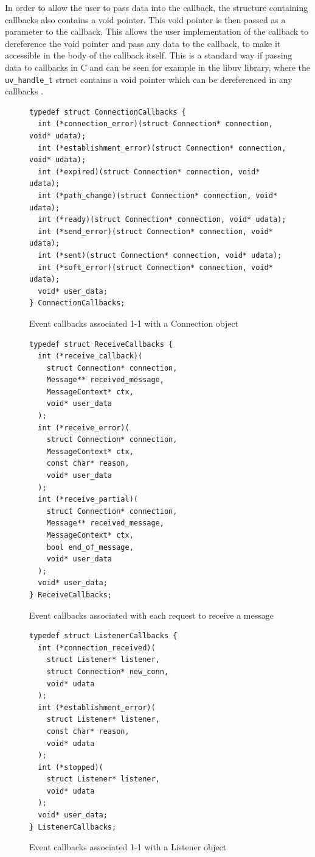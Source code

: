 In order to allow the user to pass data into the callback, the structure
containing callbacks also contains a void pointer. This void pointer
is then passed as a parameter to the callback. This allows the user
implementation of the callback to dereference the void pointer
and pass any data to the callback, to make it accessible in
the body of the callback itself. This is a standard 
way if passing data to callbacks in C and can be
seen for example in the libuv library, where the
\texttt{uv\_handle\_t} struct contains a void pointer which
can be dereferenced in any callbacks \cite{libuvUv_handle_tDocumentation2025}.

\begin{figure}[H]
\centering
\begin{verbatim}
typedef struct ConnectionCallbacks {
  int (*connection_error)(struct Connection* connection, void* udata);
  int (*establishment_error)(struct Connection* connection, void* udata);
  int (*expired)(struct Connection* connection, void* udata);
  int (*path_change)(struct Connection* connection, void* udata);
  int (*ready)(struct Connection* connection, void* udata);
  int (*send_error)(struct Connection* connection, void* udata);
  int (*sent)(struct Connection* connection, void* udata);
  int (*soft_error)(struct Connection* connection, void* udata);
  void* user_data;
} ConnectionCallbacks;
\end{verbatim}
\label{fig:connectionCallbackStructure}
\caption{Event callbacks associated 1-1 with a Connection object}
\end{figure}

\begin{figure}[H]
\centering
\begin{verbatim}
typedef struct ReceiveCallbacks {
  int (*receive_callback)(
    struct Connection* connection,
    Message** received_message,
    MessageContext* ctx,
    void* user_data
  );
  int (*receive_error)(
    struct Connection* connection,
    MessageContext* ctx,
    const char* reason,
    void* user_data
  );
  int (*receive_partial)(
    struct Connection* connection,
    Message** received_message,
    MessageContext* ctx,
    bool end_of_message, 
    void* user_data
  );
  void* user_data;
} ReceiveCallbacks;
\end{verbatim}
\label{fig:receiveCallbackStructure}
\caption{Event callbacks associated with each request to receive a message}
\end{figure}

\begin{figure}[H]
\centering
\begin{verbatim}
typedef struct ListenerCallbacks {
  int (*connection_received)(
    struct Listener* listener,
    struct Connection* new_conn,
    void* udata
  );
  int (*establishment_error)(
    struct Listener* listener,
    const char* reason,
    void* udata
  );
  int (*stopped)(
    struct Listener* listener,
    void* udata
  );
  void* user_data;
} ListenerCallbacks;
\end{verbatim}
\label{fig:listenerCallbackStructure}
\caption{Event callbacks associated 1-1 with a Listener object}
\end{figure}

